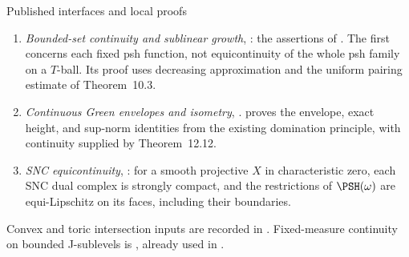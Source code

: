 \begin{important}{Published interfaces and local proofs}
\begin{enumerate}
      in the extreme-point description
      \cite[Proposition~11.3]{BJ22}.
\item\label{itm:ch49-import:equicontinuity}
      \emph{Bounded-set continuity and sublinear growth},
      \cite[Theorems~11.11--11.12]{BJ22}:
      the assertions of .
      The first concerns each fixed psh function, not equicontinuity
      of the whole psh family on a $T$-ball.  Its proof uses decreasing
      approximation and the uniform pairing estimate of Theorem~10.3.
\item\label{itm:ch49-import:green}
      \emph{Continuous Green envelopes and isometry},
      \cite[Theorem~12.12 and Proposition~12.14]{BJ22}.
       proves the envelope, exact height,
      and sup-norm identities from the existing domination principle,
      with continuity supplied by Theorem~12.12.
\item\label{itm:ch49-import:snc}
      \emph{SNC equicontinuity},
      \cite[Theorem~A.4]{BJ22}: for a smooth projective $X$ in
      characteristic zero, each SNC dual complex is strongly compact,
      and the restrictions of $\PSH(\omega)$ are equi-Lipschitz on
      its faces, including their boundaries.
\end{enumerate}
Convex and toric intersection inputs are recorded in
.  Fixed-measure continuity on bounded
J-sublevels is \cite[Proposition~9.19]{BJ22}, already used in
.
\end{important}


